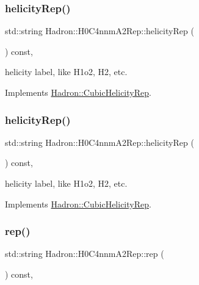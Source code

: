 \subsubsection{\texorpdfstring{helicityRep()}{helicityRep()}\hspace{0.1cm}{\footnotesize\ttfamily [2/3]}}
{\footnotesize\ttfamily std\+::string Hadron\+::\+H0\+C4nnm\+A2\+Rep\+::helicity\+Rep (\begin{DoxyParamCaption}{ }\end{DoxyParamCaption}) const\hspace{0.3cm}{\ttfamily [inline]}, {\ttfamily [virtual]}}

helicity label, like H1o2, H2, etc. 

Implements \mbox{\hyperlink{structHadron_1_1CubicHelicityRep_af1096946b7470edf0a55451cc662f231}{Hadron\+::\+Cubic\+Helicity\+Rep}}.

\mbox{\label{structHadron_1_1H0C4nnmA2Rep_ace5618f2fa58722ccfaa15a545339f88}} 
\subsubsection{\texorpdfstring{helicityRep()}{helicityRep()}\hspace{0.1cm}{\footnotesize\ttfamily [3/3]}}
{\footnotesize\ttfamily std\+::string Hadron\+::\+H0\+C4nnm\+A2\+Rep\+::helicity\+Rep (\begin{DoxyParamCaption}{ }\end{DoxyParamCaption}) const\hspace{0.3cm}{\ttfamily [inline]}, {\ttfamily [virtual]}}

helicity label, like H1o2, H2, etc. 

Implements \mbox{\hyperlink{structHadron_1_1CubicHelicityRep_af1096946b7470edf0a55451cc662f231}{Hadron\+::\+Cubic\+Helicity\+Rep}}.

\mbox{\label{structHadron_1_1H0C4nnmA2Rep_a7d5e9bf3b8a6abda949a015707a87dff}} 
\subsubsection{\texorpdfstring{rep()}{rep()}\hspace{0.1cm}{\footnotesize\ttfamily [1/5]}}
{\footnotesize\ttfamily std\+::string Hadron\+::\+H0\+C4nnm\+A2\+Rep\+::rep (\begin{DoxyParamCaption}{ }\end{DoxyParamCaption}) const\hspace{0.3cm}{\ttfamily [inline]}, {\ttfamily [virtual]}}



